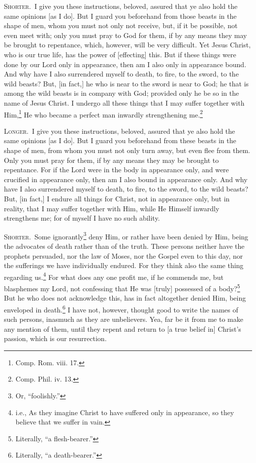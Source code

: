 
\textsc{Shorter.}~I give you these instructions, beloved, assured that ye also hold the same opinions [as I do]. But I  guard you beforehand from those beasts in the shape of men, whom you must not only not receive, but, if it be possible, not even meet with; only you must pray to God for them, if by any means they may be brought to repentance, which, however, will be very difficult. Yet Jesus Christ, who is our true life, has the power of [effecting] this. But if these things were done by our Lord only in appearance, then am I also only in appearance bound. And why have I also surrendered myself to death, to fire, to the sword, to the wild beasts? But, [in fact,] he who is near to the sword is near to God; he that is among the wild beasts is in company with God; provided only he be so in the name of Jesus Christ. I undergo all these things that I may suffer together with Him,\footnote{Comp. Rom. viii. 17.} He who became a perfect man inwardly strengthening me.\footnote{Comp. Phil. iv. 13.}

\textsc{Longer.}~I give you these instructions, beloved, assured that ye also hold the same opinions [as I do]. But I guard you beforehand from these beasts in the shape of men, from whom you must not only turn away, but even flee from them. Only you must pray for them, if by any means they may be brought to repentance. For if the Lord were in the body in appearance only, and were crucified in appearance only, then am I also bound in appearance only. And why have I also surrendered myself to death, to fire, to the sword, to the wild beasts? But, [in fact,] I endure all things for Christ, not in appearance only, but in reality, that I may suffer together with Him, while He Himself inwardly strengthens me; for of myself I have no such ability.


\textsc{Shorter.}~Some ignorantly\footnote{Or, “foolishly.”} deny Him, or rather have been denied by Him, being the advocates of death rather than of the truth. These persons neither have the prophets persuaded, nor the law of Moses, nor the Gospel even to this day, nor the sufferings we have individually endured. For they think also the same thing regarding us.\footnote{i.e., As they imagine Christ to have suffered only in appearance, so they believe that we suffer in vain.} For what does any one profit me, if he commends me, but blasphemes my Lord, not confessing that He was [truly] possessed of a body?\footnote{Literally, “a flesh-bearer.”} But he who does not acknowledge this, has in fact altogether denied Him, being enveloped in death.\footnote{Literally, “a death-bearer.”} I have not, however, thought good to write the names of such persons, inasmuch as they are unbelievers. Yea, far be it from me to make any mention of them, until they repent and return to [a true belief in] Christ’s passion, which is our resurrection.

